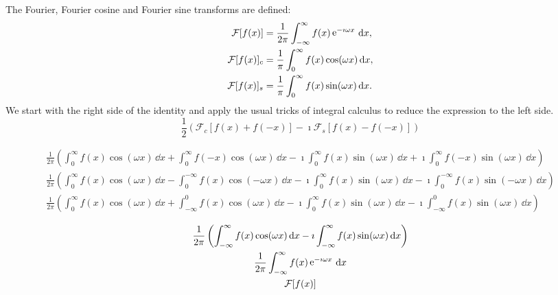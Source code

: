 {%
\begin{Solution}
  \label{solution ode ft ft fct fst}
  The Fourier, Fourier cosine and Fourier sine transforms are defined:
  \begin{align*}
    \mathcal{F}[f(x)] &= \frac{1}{2\pi} \int_{-\infty}^\infty f(x) \mathop{\mathrm{e}}\nolimits^{-\imath \omega x} \,\mathrm{d} x, \\
    \mathcal{F}[f(x)]_c &= \frac{1}{\pi} \int_0^\infty f(x) \cos(\omega x) \,\mathrm{d} x, \\
    \mathcal{F}[f(x)]_s &= \frac{1}{\pi} \int_0^\infty f(x) \sin(\omega x) \,\mathrm{d} x. 
  \end{align*}
  We start with the right side of the identity and apply the usual tricks of
  integral calculus to reduce the expression to the left side.
  \[
  \frac{1}{2} \left( \mathcal{F}_c [f(x) + f(-x)] 
    -\imath \mathcal{F}_s [f(x) - f(-x)] \right) 
  \]
  \begin{small}
    \begin{gather*}
      \frac{1}{2\pi} \left( 
        \int_0^\infty f(x) \cos( \omega x )\,\dd x
        + \int_0^\infty f(-x) \cos( \omega x )\,\dd x
        - \imath \int_0^\infty f(x) \sin( \omega x )\,\dd x
        + \imath \int_0^\infty f(-x) \sin( \omega x )\,\dd x \right) \\
      \frac{1}{2 \pi} \left( 
        \int_0^\infty f(x) \cos( \omega x )\,\dd x
        - \int_0^{-\infty} f(x) \cos( - \omega x )\,\dd x
        - \imath \int_0^\infty f(x) \sin( \omega x )\,\dd x
        - \imath \int_0^{-\infty} f(x) \sin( - \omega x )\,\dd x \right) \\
      \frac{1}{2 \pi} \left( 
        \int_0^\infty f(x) \cos( \omega x )\,\dd x
        + \int_{-\infty}^0 f(x) \cos( \omega x )\,\dd x
        - \imath \int_0^\infty f(x) \sin( \omega x )\,\dd x
        - \imath \int_{-\infty}^0 f(x) \sin( \omega x )\,\dd x \right) 
    \end{gather*}
  \end{small}
  \begin{gather*}
    \frac{1}{2 \pi} \left( 
      \int_{-\infty}^\infty f(x) \cos( \omega x )\,\mathrm{d} x
      - \imath \int_{-\infty}^\infty f(x) \sin( \omega x )\,\mathrm{d} x \right) \\
    \frac{1}{2 \pi} \int_{-\infty}^\infty f(x) \mathop{\mathrm{e}}\nolimits^{-\imath \omega x} \,\mathrm{d} x \\
    \mathcal{F}[f(x)]
  \end{gather*}
\end{Solution}






}
